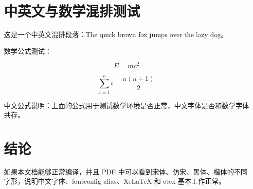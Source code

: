 \documentclass[UTF8,a4paper,12pt]{ctexart}
\begin{document}
\section{中英文与数学混排测试}

这是一个中英文混排段落：The quick brown fox jumps over the lazy dog。

数学公式测试：

\[
E = mc^2
\]

\[
\sum_{i=1}^{n} i = \frac{n(n+1)}{2}
\]

中文公式说明：上面的公式用于测试数学环境是否正常，中文字体是否和数学字体共存。

\section{结论}

如果本文档能够正常编译，并且 PDF 中可以看到宋体、仿宋、黑体、楷体的不同字形，说明中文字体、fontconfig alias、XeLaTeX 和 ctex 基本工作正常。
\end{document}
